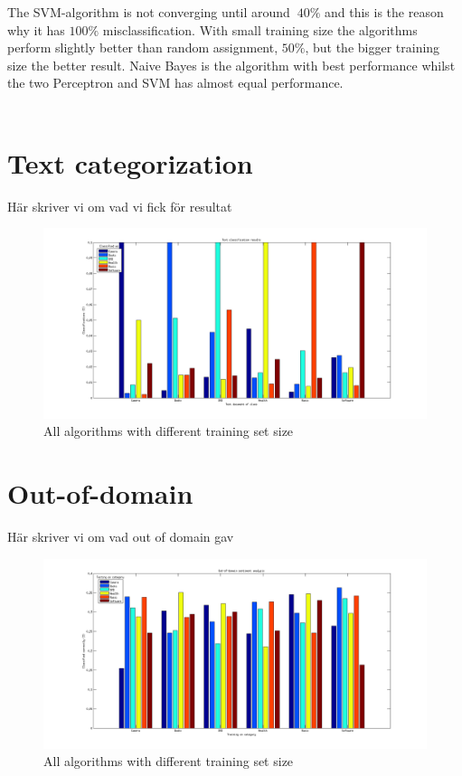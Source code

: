 The SVM-algorithm is not converging until around $~40 \%$ and this is the reason why it has $100 \%$ misclassification. With small training size the algorithms perform slightly better than random assignment, $50 \%$, but the bigger training size the better result. Naive Bayes is the algorithm with best performance whilst the two Perceptron and SVM has almost equal performance. 
\\\\
\section{Text categorization}
Här skriver vi om vad vi fick för resultat
\begin{figure}[h!]
\centering
\includegraphics[scale = 0.3]{../Plottar/text_categorization.png}
\caption{All algorithms with different training set size}
\label{fig:textcategorization}
\end{figure}  
\section{Out-of-domain}
Här skriver vi om vad out of domain gav
\begin{figure}[h!]
\centering
\includegraphics[scale = 0.3]{../Plottar/outofdomain.png}
\caption{All algorithms with different training set size}
\label{fig:outofdomain}
\end{figure}  

